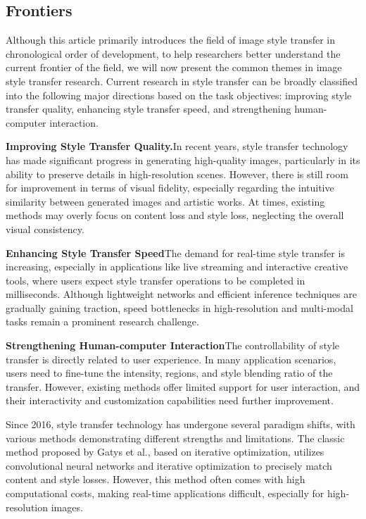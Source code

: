 \documentclass[preprint,12pt]{elsarticle}
\begin{document}
\subsection{Frontiers}

Although this article primarily introduces the field of image style transfer in chronological order of development, to help researchers better understand the current frontier of the field, we will now present the common themes in image style transfer research. Current research in style transfer can be broadly classified into the following major directions based on the task objectives: improving style transfer quality, enhancing style transfer speed, and strengthening human-computer interaction.

\textbf{Improving Style Transfer Quality.}\quad In recent years, style transfer technology has made significant progress in generating high-quality images\citep{50li2023compact,50li2023compact,47wu2023preserving,118wen2023cap,54hong2023aespa,55zhu2023all,112huang2023quantart}, particularly in its ability to preserve details in high-resolution scenes. However, there is still room for improvement in terms of visual fidelity, especially regarding the intuitive similarity between generated images and artistic works. At times, existing methods may overly focus on content loss and style loss, neglecting the overall visual consistency.

\textbf{Enhancing Style Transfer Speed}\quad The demand for real-time style transfer is increasing, especially in applications like live streaming and interactive creative tools, where users expect style transfer operations to be completed in milliseconds. Although lightweight networks and efficient inference techniques are gradually gaining traction\citep{50li2023compact,72wang2023microast,78lin2023adacm,114tang2023master}, speed bottlenecks in high-resolution and multi-modal tasks remain a prominent research challenge.

\textbf{Strengthening Human-computer Interaction}\quad The controllability of style transfer\citep{52wang2023interactive,78lin2023adacm,03li2023frequency,80cheng2023user,62zhang2023inversion,64wang2023stylediffusion} is directly related to user experience. In many application scenarios, users need to fine-tune the intensity, regions, and style blending ratio of the transfer. However, existing methods offer limited support for user interaction, and their interactivity and customization capabilities need further improvement.

Since 2016, style transfer technology has undergone several paradigm shifts, with various methods demonstrating different strengths and limitations. The classic method proposed by Gatys et al., based on iterative optimization, utilizes convolutional neural networks and iterative optimization to precisely match content and style losses. However, this method often comes with high computational costs, making real-time applications difficult, especially for high-resolution images.
\end{document}
